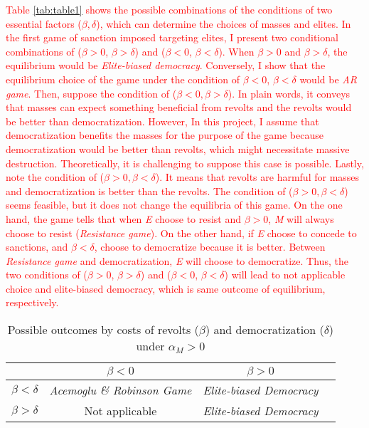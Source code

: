 \documentclass[11pt, letterpage]{article}
\begin{document}
\textcolor{red}{Table \ref{tab:table1} shows the possible combinations of the conditions of two essential factors ($\beta, \delta$), which can determine the choices of masses and elites. In the first game of sanction imposed targeting elites, I present two conditional combinations of ($\beta > 0$, $\beta > \delta$) and ($\beta < 0$, $\beta < \delta$). When $\beta > 0$ and $\beta > \delta$, the equilibrium would be \textit{Elite-biased democracy}. Conversely, I show that the equilibrium choice of the game under the condition of $\beta < 0$, $\beta < \delta$ would be \textit{AR game}. Then, suppose the condition of ($\beta < 0, \beta > \delta$). In plain words, it conveys that masses can expect something beneficial from revolts and the revolts would be better than democratization. However, In this project, I assume that democratization benefits the masses for the purpose of the game because democratization would be better than revolts, which might necessitate massive destruction. Theoretically, it is challenging to suppose this case is possible. Lastly, note the condition of ($\beta > 0, \beta < \delta$). It means that revolts are harmful for masses and democratization is better than the revolts. The condition of ($\beta > 0, \beta < \delta$) seems feasible, but it does not change the equilibria of this game. On the one hand, the game tells that when \textit{E} choose to resist and $\beta>0$,  \textit{M} will always choose to resist (\textit{Resistance game}). On the other hand, if \textit{E} choose to concede to sanctions, and $\beta < \delta$,  choose to democratize because it is better. Between \textit{Resistance game} and democratization, \textit{E} will choose to democratize. Thus, the two conditions of ($\beta > 0$, $\beta > \delta$) and ($\beta < 0$, $\beta < \delta$) will lead to not applicable choice and elite-biased democracy, which is same outcome of equilibrium, respectively.}

\begin{table}[!ht]
	\centering
	\begin{tabular}{l*{3}{c}}
		\toprule
		&\multicolumn{1}{c}{$\beta < 0$}		&\multicolumn{1}{c}{$\beta > 0$} \\
		\midrule
		$\beta < \delta$	   & \textit{Acemoglu \& Robinson Game} & \textit{Elite-biased Democracy}\\
		$\beta > \delta$	   & Not applicable					 	& \textit{Elite-biased Democracy}\\
		\bottomrule
	\end{tabular}
	\caption{Possible outcomes by costs of revolts ($\beta$) and democratization ($\delta$) under $\alpha_{M} > 0$}
	\label{tab:table2}
\end{table}
\end{document}
